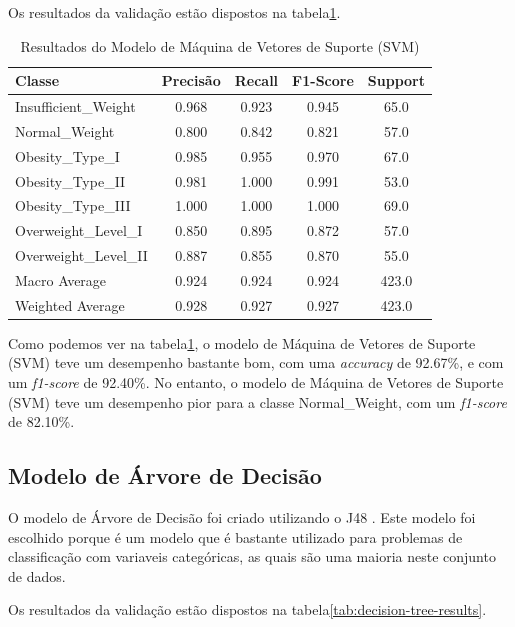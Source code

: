 \documentclass{easychair}
\begin{document}
Os resultados da validação estão dispostos na tabela\ref{tab:svm-results}.

\begin{table}[hbt!]
  \centering
  \begin{tabular}{l c c c c}
  \toprule
  Classe                & Precisão  & Recall & F1-Score & Support \\
  \midrule
  Insufficient\_Weight  & 0.968     & 0.923  & 0.945    & 65.0    \\
  Normal\_Weight        & 0.800     & 0.842  & 0.821    & 57.0    \\
  Obesity\_Type\_I      & 0.985     & 0.955  & 0.970    & 67.0    \\
  Obesity\_Type\_II     & 0.981     & 1.000  & 0.991    & 53.0    \\
  Obesity\_Type\_III    & 1.000     & 1.000  & 1.000    & 69.0    \\
  Overweight\_Level\_I  & 0.850     & 0.895  & 0.872    & 57.0    \\
  Overweight\_Level\_II & 0.887     & 0.855  & 0.870    & 55.0    \\
  \midrule
  Macro Average         & 0.924     & 0.924  & 0.924    & 423.0   \\
  Weighted Average      & 0.928     & 0.927  & 0.927    & 423.0   \\
  \bottomrule
  \end{tabular}
  \caption{Resultados do Modelo de Máquina de Vetores de Suporte (SVM)}
  \label{tab:svm-results}
\end{table}

Como podemos ver na tabela\ref{tab:svm-results}, o modelo de Máquina de Vetores de Suporte (SVM) teve um desempenho bastante bom, com uma \textit{accuracy} de 92.67\%, e com um \textit{f1-score} de 92.40\%. No entanto, o modelo de Máquina de Vetores de Suporte (SVM) teve um desempenho pior para a classe Normal\_Weight, com um \textit{f1-score} de 82.10\%.

\subsection{Modelo de Árvore de Decisão}

O modelo de Árvore de Decisão foi criado utilizando o J48 \cite{j48}. Este modelo foi escolhido porque é um modelo que é bastante utilizado para problemas de classificação com variaveis categóricas, as quais são uma maioria neste conjunto de dados.

Os resultados da validação estão dispostos na tabela\ref{tab:decision-tree-results}.
\end{document}
